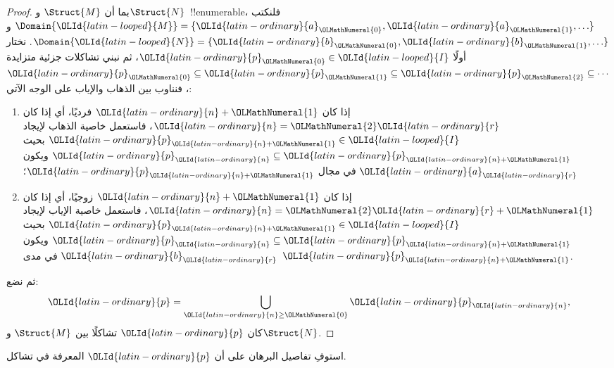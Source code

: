 \documentclass[../../../include/open-logic-section]{subfiles}
\begin{document}
\begin{proof}
  بما أن $\Struct{M}$ و$\Struct{N}$~!!{enumerable}، فلنكتب
  $\Domain{{\OLId{latin-looped}{M}}} = \{{\OLId{latin-ordinary}{a}}_{\OLMathNumeral{0}}, {\OLId{latin-ordinary}{a}}_{\OLMathNumeral{1}}, \ldots \}$ و
  $\Domain{{\OLId{latin-looped}{N}}} = \{{\OLId{latin-ordinary}{b}}_{\OLMathNumeral{0}}, {\OLId{latin-ordinary}{b}}_{\OLMathNumeral{1}}, \ldots \}$. نختار أولًا ${\OLId{latin-ordinary}{p}}_{\OLMathNumeral{0}} \in {\OLId{latin-looped}{I}}$،
  ثم نبني تشاكلات جزئية متزايدة
  ${\OLId{latin-ordinary}{p}}_{\OLMathNumeral{0}} \subseteq {\OLId{latin-ordinary}{p}}_{\OLMathNumeral{1}} \subseteq {\OLId{latin-ordinary}{p}}_{\OLMathNumeral{2}} \subseteq \cdots$، فنناوب
  بين الذهاب والإياب على الوجه الآتي:
  \begin{enumerate}
  \item إذا كان ${\OLId{latin-ordinary}{n}}+{\OLMathNumeral{1}}$ فرديًا، أي إذا كان ${\OLId{latin-ordinary}{n}} = {\OLMathNumeral{2}}{\OLId{latin-ordinary}{r}}$، فاستعمل خاصية الذهاب
    لإيجاد ${\OLId{latin-ordinary}{p}}_{{\OLId{latin-ordinary}{n}}+{\OLMathNumeral{1}}} \in {\OLId{latin-looped}{I}}$ بحيث ${\OLId{latin-ordinary}{p}}_{\OLId{latin-ordinary}{n}} \subseteq {\OLId{latin-ordinary}{p}}_{{\OLId{latin-ordinary}{n}}+{\OLMathNumeral{1}}}$ ويكون ${\OLId{latin-ordinary}{a}}_{\OLId{latin-ordinary}{r}}$
    في مجال ${\OLId{latin-ordinary}{p}}_{{\OLId{latin-ordinary}{n}}+{\OLMathNumeral{1}}}$؛
  \item إذا كان ${\OLId{latin-ordinary}{n}}+{\OLMathNumeral{1}}$ زوجيًا، أي إذا كان ${\OLId{latin-ordinary}{n}}={\OLMathNumeral{2}}{\OLId{latin-ordinary}{r}}+{\OLMathNumeral{1}}$، فاستعمل خاصية الإياب
    لإيجاد ${\OLId{latin-ordinary}{p}}_{{\OLId{latin-ordinary}{n}}+{\OLMathNumeral{1}}} \in {\OLId{latin-looped}{I}}$ بحيث ${\OLId{latin-ordinary}{p}}_{\OLId{latin-ordinary}{n}} \subseteq {\OLId{latin-ordinary}{p}}_{{\OLId{latin-ordinary}{n}}+{\OLMathNumeral{1}}}$ ويكون ${\OLId{latin-ordinary}{b}}_{\OLId{latin-ordinary}{r}}$
    في مدى ${\OLId{latin-ordinary}{p}}_{{\OLId{latin-ordinary}{n}}+{\OLMathNumeral{1}}}$.
  \end{enumerate}
ثم نضع:
\[
{\OLId{latin-ordinary}{p}} = \bigcup_{{\OLId{latin-ordinary}{n}}\ge {\OLMathNumeral{0}}} {\OLId{latin-ordinary}{p}}_{\OLId{latin-ordinary}{n}},
\]
كان ${\OLId{latin-ordinary}{p}}$ تشاكلًا بين $\Struct{M}$ و$\Struct{N}$.
\end{proof}

\begin{prob}
  استوفِ تفاصيل البرهان على أن ${\OLId{latin-ordinary}{p}}$ المعرفة في
   تشاكل.
\end{prob}
\end{document}
